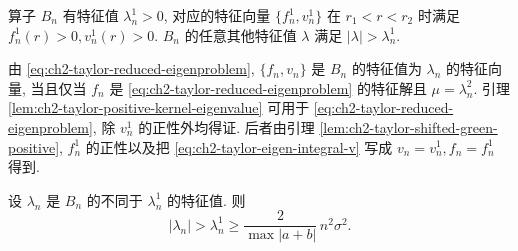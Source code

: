 \begin{Lemma}
\label{lem:ch2-taylor-bn-principal-eigenvalue}
算子 $B_n$ 有特征值 $\lambda_n^1>0$, 对应的特征向量 $\{f_n^1,v_n^1\}$ 在 $r_1<r<r_2$ 时满足 $f_n^1(r)>0,v_n^1(r)>0$. $B_n$ 的任意其他特征值 $\lambda$ 满足 $|\lambda|>\lambda_n^1$.
\end{Lemma}

\begin{Proof}
由 \eqref{eq:ch2-taylor-reduced-eigenproblem}, $\{f_n,v_n\}$ 是 $B_n$ 的特征值为 $\lambda_n$ 的特征向量, 当且仅当 $f_n$ 是 \eqref{eq:ch2-taylor-reduced-eigenproblem} 的特征解且 $\mu=\lambda_n^2$. 引理 \ref{lem:ch2-taylor-positive-kernel-eigenvalue} 可用于 \eqref{eq:ch2-taylor-reduced-eigenproblem}, 除 $v_n^1$ 的正性外均得证. 后者由引理 \ref{lem:ch2-taylor-shifted-green-positive}, $f_n^1$ 的正性以及把 \eqref{eq:ch2-taylor-eigen-integral-v} 写成 $v_n=v_n^1,f_n=f_n^1$ 得到.
\end{Proof}

\begin{Lemma}
\label{lem:ch2-taylor-bn-spectral-gap}
设 $\lambda_n$ 是 $B_n$ 的不同于 $\lambda_n^1$ 的特征值. 则
\begin{equation}
|\lambda_n|>\lambda_n^1
\geq\frac2{\max|a+b|}\,n^2\sigma^2.
\label{eq:ch2-taylor-bn-spectral-bound}
\end{equation}
\end{Lemma}

